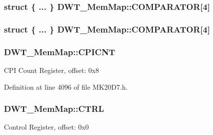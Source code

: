 \subsubsection[{\texorpdfstring{C\+O\+M\+P\+A\+R\+A\+T\+OR}{COMPARATOR}}]{\setlength{\rightskip}{0pt plus 5cm}struct \{ ... \}   D\+W\+T\+\_\+\+Mem\+Map\+::\+C\+O\+M\+P\+A\+R\+A\+T\+OR\mbox{[}4\mbox{]}}\hypertarget{struct_d_w_t___mem_map_a073973bfaf50e3c1047b283e8949af0d}{}\label{struct_d_w_t___mem_map_a073973bfaf50e3c1047b283e8949af0d}
\subsubsection[{\texorpdfstring{C\+O\+M\+P\+A\+R\+A\+T\+OR}{COMPARATOR}}]{\setlength{\rightskip}{0pt plus 5cm}struct \{ ... \}   D\+W\+T\+\_\+\+Mem\+Map\+::\+C\+O\+M\+P\+A\+R\+A\+T\+OR\mbox{[}4\mbox{]}}\hypertarget{struct_d_w_t___mem_map_a036bc13ac73bf909e46c64ddb7c74c58}{}\label{struct_d_w_t___mem_map_a036bc13ac73bf909e46c64ddb7c74c58}
\subsubsection[{\texorpdfstring{C\+P\+I\+C\+NT}{CPICNT}}]{ D\+W\+T\+\_\+\+Mem\+Map\+::\+C\+P\+I\+C\+NT}\hypertarget{struct_d_w_t___mem_map_ad09ed41fc08aebfa2c29e217afcf9a93}{}\label{struct_d_w_t___mem_map_ad09ed41fc08aebfa2c29e217afcf9a93}
C\+PI Count Register, offset\+: 0x8 

Definition at line 4096 of file M\+K20\+D7.\+h.

\subsubsection[{\texorpdfstring{C\+T\+RL}{CTRL}}]{ D\+W\+T\+\_\+\+Mem\+Map\+::\+C\+T\+RL}\hypertarget{struct_d_w_t___mem_map_ab3581abb33e428126e7ec339e66514e4}{}\label{struct_d_w_t___mem_map_ab3581abb33e428126e7ec339e66514e4}
Control Register, offset\+: 0x0 

